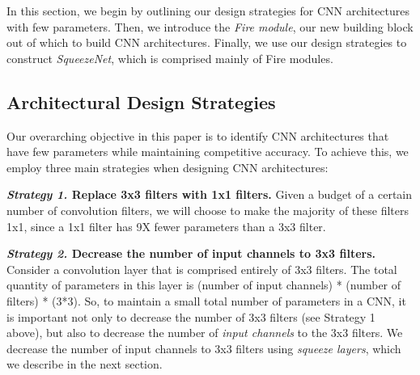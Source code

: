 \documentclass{article} \usepackage{iclr2017_conference,times}
\def\vsp{\vspace{-0.15in}}
\begin{document}
In this section, we begin by outlining our design strategies for CNN architectures with few parameters.
Then, we introduce the {\em Fire module}, our new building block out of which to build CNN architectures.
Finally, we use our design strategies to construct {\em SqueezeNet}, which is comprised mainly of Fire modules.


\subsection{Architectural Design Strategies}
\label{sec:design-strategies}
\vsp

Our overarching objective in this paper is to identify CNN architectures that have few parameters while maintaining competitive accuracy. 
To achieve this, we employ three main strategies when designing CNN architectures: 

\noindent
{\bf {\em Strategy 1.} Replace 3x3 filters with 1x1 filters.} 
Given a budget of a certain number of convolution filters, we will choose to make the majority of these filters 1x1, since a 1x1 filter has 9X fewer parameters than a 3x3 filter. 
\vspace{0.1in} 

\noindent
{\bf {\em Strategy 2.} Decrease the number of input channels to 3x3 filters.} 
Consider a convolution layer that is comprised entirely of 3x3 filters. 
The total quantity of parameters in this layer is (number of input channels) * (number of filters) * (3*3). 
So, to maintain a small total number of parameters in a CNN, it is important not only to decrease the number of 3x3 filters (see Strategy 1 above), but also to decrease the number of {\em input channels} to the 3x3 filters. 
We decrease the number of input channels to 3x3 filters using {\em squeeze layers}, which we describe in the next section. 
\vspace{0.05in} 
\end{document}
